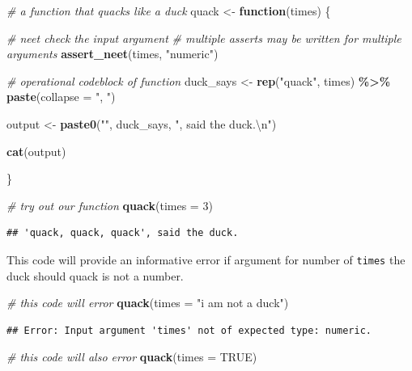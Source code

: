 \documentclass[
]{article}
\newenvironment{Shaded}{\begin{snugshade}}{\end{snugshade}}
\newcommand{\CharTok}[1]{\textcolor[rgb]{0.31,0.60,0.02}{#1}}
\newcommand{\CommentTok}[1]{\textcolor[rgb]{0.56,0.35,0.01}{\textit{#1}}}
\newcommand{\ControlFlowTok}[1]{\textcolor[rgb]{0.13,0.29,0.53}{\textbf{#1}}}
\newcommand{\DataTypeTok}[1]{\textcolor[rgb]{0.13,0.29,0.53}{#1}}
\newcommand{\DecValTok}[1]{\textcolor[rgb]{0.00,0.00,0.81}{#1}}
\newcommand{\KeywordTok}[1]{\textcolor[rgb]{0.13,0.29,0.53}{\textbf{#1}}}
\newcommand{\NormalTok}[1]{#1}
\newcommand{\OperatorTok}[1]{\textcolor[rgb]{0.81,0.36,0.00}{\textbf{#1}}}
\newcommand{\OtherTok}[1]{\textcolor[rgb]{0.56,0.35,0.01}{#1}}
\newcommand{\StringTok}[1]{\textcolor[rgb]{0.31,0.60,0.02}{#1}}
\begin{document}
\begin{Shaded}
\begin{Highlighting}[]
\CommentTok{\# a function that quacks like a duck}
\NormalTok{quack <{-}}\StringTok{ }\ControlFlowTok{function}\NormalTok{(times) \{}
  
  \CommentTok{\# neet check the input argument}
  \CommentTok{\# multiple asserts may be written for multiple arguments}
  \KeywordTok{assert\_neet}\NormalTok{(times, }\StringTok{"numeric"}\NormalTok{)}
  
  \CommentTok{\# operational codeblock of function}
\NormalTok{  duck\_says <{-}}\StringTok{ }\KeywordTok{rep}\NormalTok{(}\StringTok{"quack"}\NormalTok{, times) }\OperatorTok{\%>\%}\StringTok{ }
\StringTok{    }\KeywordTok{paste}\NormalTok{(}\DataTypeTok{collapse =} \StringTok{", "}\NormalTok{)}
  
\NormalTok{  output <{-}}\StringTok{ }\KeywordTok{paste0}\NormalTok{(}\StringTok{"\textquotesingle{}"}\NormalTok{, duck\_says, }\StringTok{"\textquotesingle{}, said the duck.}\CharTok{\textbackslash{}n}\StringTok{"}\NormalTok{)}
  
  \KeywordTok{cat}\NormalTok{(output)}
  
\NormalTok{\}}

\CommentTok{\# try out our function}
\KeywordTok{quack}\NormalTok{(}\DataTypeTok{times =} \DecValTok{3}\NormalTok{)}
\end{Highlighting}
\end{Shaded}

\begin{verbatim}
## 'quack, quack, quack', said the duck.
\end{verbatim}

This code will provide an informative error if argument for number of \texttt{times} the duck should quack is not a number.

\begin{Shaded}
\begin{Highlighting}[]
\CommentTok{\# this code will error}
\KeywordTok{quack}\NormalTok{(}\DataTypeTok{times =} \StringTok{"i am not a duck"}\NormalTok{)}
\end{Highlighting}
\end{Shaded}

\begin{verbatim}
## Error: Input argument 'times' not of expected type: numeric.
\end{verbatim}

\begin{Shaded}
\begin{Highlighting}[]
\CommentTok{\# this code will also error}
\KeywordTok{quack}\NormalTok{(}\DataTypeTok{times =} \OtherTok{TRUE}\NormalTok{)}
\end{Highlighting}
\end{Shaded}
\end{document}
